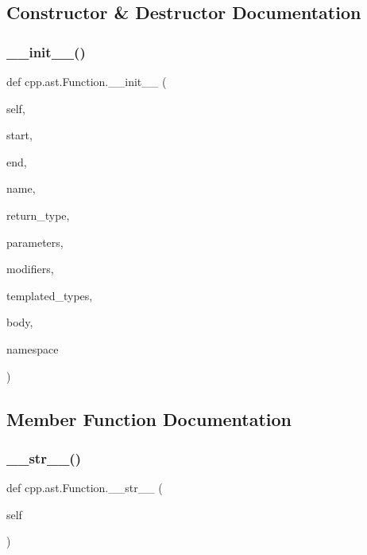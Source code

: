 \subsection{Constructor \& Destructor Documentation}
\mbox{\label{classcpp_1_1ast_1_1_function_ab5270f5d353ec5e9dcd136e4cc6c7f6c}} 
\subsubsection{\texorpdfstring{\+\_\+\+\_\+init\+\_\+\+\_\+()}{\_\_init\_\_()}}
{\footnotesize\ttfamily def cpp.\+ast.\+Function.\+\_\+\+\_\+init\+\_\+\+\_\+ (\begin{DoxyParamCaption}\item[{}]{self,  }\item[{}]{start,  }\item[{}]{end,  }\item[{}]{name,  }\item[{}]{return\+\_\+type,  }\item[{}]{parameters,  }\item[{}]{modifiers,  }\item[{}]{templated\+\_\+types,  }\item[{}]{body,  }\item[{}]{namespace }\end{DoxyParamCaption})}



\subsection{Member Function Documentation}
\mbox{\label{classcpp_1_1ast_1_1_function_aaef91d6a3b1eb2703eebb32d39c45978}} 
\subsubsection{\texorpdfstring{\+\_\+\+\_\+str\+\_\+\+\_\+()}{\_\_str\_\_()}}
{\footnotesize\ttfamily def cpp.\+ast.\+Function.\+\_\+\+\_\+str\+\_\+\+\_\+ (\begin{DoxyParamCaption}\item[{}]{self }\end{DoxyParamCaption})}


